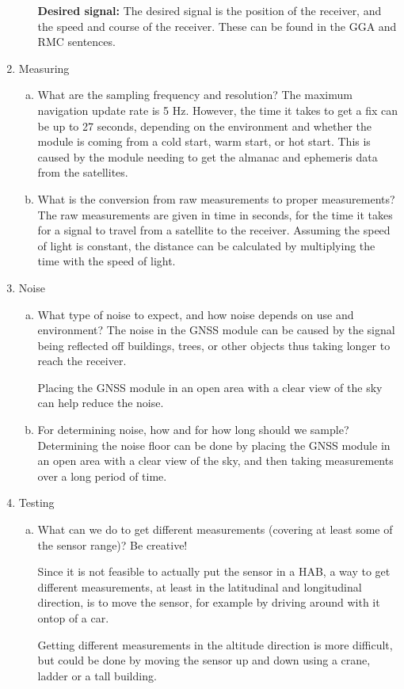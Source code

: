 \begin{enumerate}
\begin{enumerate}[(a)]
        \textbf{Desired signal:}
        The desired signal is the position of the receiver, and the speed and course of the receiver.
        These can be found in the GGA and RMC sentences.
    \end{enumerate}
    \item Measuring
    \begin{enumerate}[(a)]
        \item What are the sampling frequency and resolution?
        The maximum navigation update rate is 5 Hz. %
        However, the time it takes to get a fix can be up to 27 seconds, depending on the environment and whether the module is coming from a cold start, warm start, or hot start.
        This is caused by the module needing to get the almanac and ephemeris data from the satellites.

        \item What is the conversion from raw measurements to proper measurements?
        The raw measurements are given in time in seconds, for the time it takes for a signal to travel from a satellite to the receiver.
        Assuming the speed of light is constant, the distance can be calculated by multiplying the time with the speed of light.

    \end{enumerate}
    \item Noise
    \begin{enumerate}[(a)]
        \item What type of noise to expect, and how noise depends on use and environment?
        The noise in the GNSS module can be caused by the signal being reflected off buildings, trees, or other objects thus taking longer to reach the receiver.

        Placing the GNSS module in an open area with a clear view of the sky can help reduce the noise.


        \item For determining noise, how and for how long should we sample?
        Determining the noise floor can be done by placing the GNSS module in an open area with a clear view of the sky, and then taking measurements over a long period of time.

    \end{enumerate}
    \item Testing
    \begin{enumerate}[(a)]
        \item What can we do to get different measurements (covering at least some of the sensor range)? Be creative!

        Since it is not feasible to actually put the sensor in a HAB, a way to get different measurements, at least in the latitudinal and longitudinal direction, is to move the sensor, for example by driving around with it ontop of a car.

        Getting different measurements in the altitude direction is more difficult, but could be done by moving the sensor up and down using a crane, ladder or a tall building.
    \end{enumerate}
\end{enumerate}







